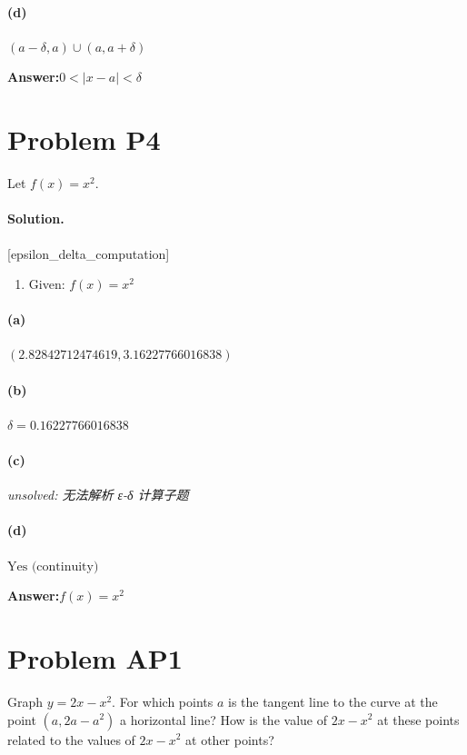 \documentclass[11pt,a4paper]{article}
\newcommand{\solvertag}[1]{{\footnotesize\color{gray}\textsf{[#1]}}}
\begin{document}
\paragraph{(d)} $(a - \delta, a) \cup (a, a + \delta)$

\noindent\textbf{Answer:}\quad $0 < |x - a| < \delta$

\medskip

\section*{Problem P4}
Let $f(x) = x^2$.

\paragraph{Solution.} \solvertag{epsilon\_delta\_computation} 

\begin{enumerate}[leftmargin=*]
  \item Given: $f(x) = x^{2}$
\end{enumerate}

\paragraph{(a)} $(2.82842712474619, 3.16227766016838)$

\paragraph{(b)} $\delta = 0.16227766016838$

\paragraph{(c)} {\color{red}\textit{unsolved: 无法解析 ε-δ 计算子题}}

\paragraph{(d)} $\text{Yes (continuity)}$

\noindent\textbf{Answer:}\quad $f(x) = x^{2}$

\medskip

\section*{Problem AP1}
Graph $y = 2x - x^2$. For which points $a$ is the tangent line to the curve at the point $(a, 2a - a^2)$ a horizontal line? How is the value of $2x - x^2$ at these points related to the values of $2x - x^2$ at other points?
\end{document}
